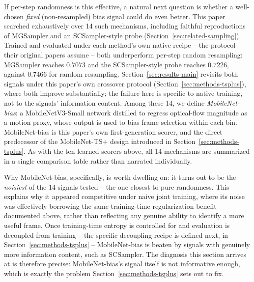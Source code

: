 \documentclass[preprint,12pt]{elsarticle}
\begin{document}
If per-step randomness is this effective, a natural next question is whether a well-chosen \emph{fixed} (non-resampled) bias signal could do even better. This paper searched exhaustively over 14 such mechanisms, including faithful reproductions of MGSampler and an SCSampler-style probe (Section~\ref{sec:related-sampling}). Trained and evaluated under each method's own native recipe -- the protocol their original papers assume -- both underperform per-step random resampling: MGSampler reaches 0.7073 and the SCSampler-style probe reaches 0.7226, against 0.7466 for random resampling. Section~\ref{sec:results-main} revisits both signals under this paper's own crossover protocol (Section~\ref{sec:methods-tsplus}), where both improve substantially; the failure here is specific to native training, not to the signals' information content. Among these 14, we define \emph{MobileNet-bias}: a MobileNetV3-Small network distilled to regress optical-flow magnitude as a motion proxy, whose output is used to bias frame selection within each bin. MobileNet-bias is this paper's own first-generation scorer, and the direct predecessor of the MobileNet-TS+ design introduced in Section~\ref{sec:methods-tsplus}. As with the ten learned scorers above, all 14 mechanisms are summarized in a single comparison table rather than narrated individually.

Why MobileNet-bias, specifically, is worth dwelling on: it turns out to be the \emph{noisiest} of the 14 signals tested -- the one closest to pure randomness. This explains why it appeared competitive under naive joint training, where its noise was effectively borrowing the same training-time regularization benefit documented above, rather than reflecting any genuine ability to identify a more useful frame. Once training-time entropy is controlled for and evaluation is decoupled from training -- the specific decoupling recipe is defined next, in Section~\ref{sec:methods-tsplus} -- MobileNet-bias is beaten by signals with genuinely more information content, such as SCSampler. The diagnosis this section arrives at is therefore precise: MobileNet-bias's signal itself is not informative enough, which is exactly the problem Section~\ref{sec:methods-tsplus} sets out to fix.
\end{document}
